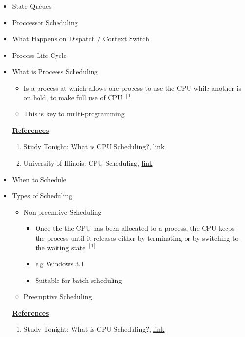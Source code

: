 \documentclass[12pt]{article}
\begin{document}
\begin{itemize}
    \item State Queues
    \item Proccessor Scheduling
    \item What Happens on Dispatch / Context Switch
    \item Process Life Cycle
    \item What is Proceess Scheduling
    \begin{itemize}
        \item Is a process at which allows one process to use the CPU while
        another is on hold, to make full use of CPU $^{[1]}$
        \item This is key to multi-programming
    \end{itemize}

    \bigskip

    \underline{\textbf{References}}

    \bigskip

    \begin{enumerate}[1)]
        \item Study Tonight: What is CPU Scheduling?, \href{https://www.studytonight.com/operating-system/cpu-scheduling}{link}
        \item University of Illinois: CPU Scheduling, \href{https://www.cs.uic.edu/~jbell/CourseNotes/OperatingSystems/6_CPU_Scheduling.html}{link}
    \end{enumerate}

    \item When to Schedule
    \item Types of Scheduling
    \begin{itemize}
        \item Non-preemtive Scheduling
        \begin{itemize}
            \item Once the the CPU has been allocated to a process, the CPU
            keeps the process until it releases either by terminating or by switching
            to the waiting state $^{[1]}$

            \item e.g Windows 3.1
            \item Suitable for batch scheduling
        \end{itemize}
        \item Preemptive Scheduling
    \end{itemize}

    \bigskip

    \underline{\textbf{References}}

    \bigskip

    \begin{enumerate}[1)]
        \item Study Tonight: What is CPU Scheduling?, \href{https://www.studytonight.com/operating-system/cpu-scheduling}{link}
    \end{enumerate}
\end{itemize}
\end{document}
